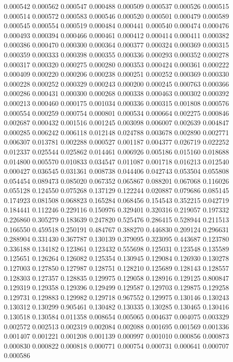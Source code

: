 0.000542
0.000562
0.000547
0.000488
0.000509
0.000537
0.000526
0.000515
0.000514
0.000572
0.000583
0.000546
0.000520
0.000501
0.000479
0.000589
0.000545
0.000554
0.000519
0.000484
0.000441
0.000540
0.000474
0.000476
0.000493
0.000394
0.000466
0.000461
0.000412
0.000414
0.000411
0.000382
0.000386
0.000470
0.000300
0.000364
0.000377
0.000324
0.000369
0.000315
0.000359
0.000333
0.000398
0.000355
0.000336
0.000293
0.000352
0.000278
0.000317
0.000320
0.000275
0.000280
0.000353
0.000424
0.000361
0.000222
0.000409
0.000220
0.000206
0.000238
0.000251
0.000252
0.000369
0.000330
0.000228
0.000252
0.000329
0.000243
0.000200
0.000245
0.000763
0.000366
0.000286
0.000431
0.000300
0.000268
0.000338
0.000463
0.000302
0.000392
0.000213
0.000460
0.000175
0.001034
0.000336
0.000315
0.001808
0.000576
0.000554
0.000259
0.000754
0.000801
0.000534
0.000664
0.002275
0.000846
0.002687
0.000432
0.001516
0.001245
0.003098
0.006007
0.002639
0.004847
0.000285
0.006242
0.006118
0.012148
0.024788
0.003678
0.002890
0.002771
0.006307
0.013781
0.002288
0.000527
0.001187
0.004377
0.026719
0.022252
0.012337
0.025544
0.025862
0.014461
0.006926
0.005186
0.015160
0.018688
0.014800
0.005570
0.010833
0.034547
0.011087
0.001718
0.016213
0.012540
0.000427
0.036545
0.031361
0.008738
0.044406
0.042743
0.053504
0.055808
0.054454
0.089473
0.085020
0.067352
0.065867
0.088201
0.067068
0.116026
0.055128
0.124550
0.075268
0.137129
0.122244
0.020887
0.079686
0.085145
0.174923
0.081508
0.068823
0.165284
0.068456
0.154543
0.352215
0.042719
0.184441
0.112246
0.229116
0.150976
0.329401
0.320316
0.219057
0.197332
0.226860
0.305279
0.183639
0.247820
0.525476
0.286415
0.528944
0.211513
0.166550
0.459518
0.250191
0.484767
0.388270
0.446830
0.209124
0.296631
0.288904
0.331430
0.367787
0.130139
0.379095
0.323095
0.443687
0.123780
0.336188
0.134182
0.123861
0.123432
0.555698
0.125031
0.123548
0.135589
0.125651
0.126264
0.126082
0.125354
0.130945
0.129084
0.126930
0.130278
0.127003
0.127850
0.127987
0.128751
0.128210
0.125689
0.128143
0.128557
0.128303
0.127357
0.128835
0.129975
0.129058
0.128916
0.129125
0.800847
0.129319
0.129358
0.129396
0.129499
0.129587
0.129703
0.129875
0.129258
0.129731
0.129883
0.129982
0.129718
0.967552
0.129975
0.130146
0.130243
0.130312
0.130299
0.905461
0.130482
0.130335
0.130285
0.130465
0.130416
0.130518
0.130584
0.011358
0.008654
0.005065
0.004637
0.004075
0.003329
0.002572
0.002513
0.002319
0.002084
0.002088
0.001695
0.001569
0.001336
0.001407
0.001221
0.001208
0.001139
0.000997
0.001010
0.000856
0.000873
0.000830
0.000822
0.000818
0.000771
0.000754
0.000731
0.000641
0.000707
0.000586
